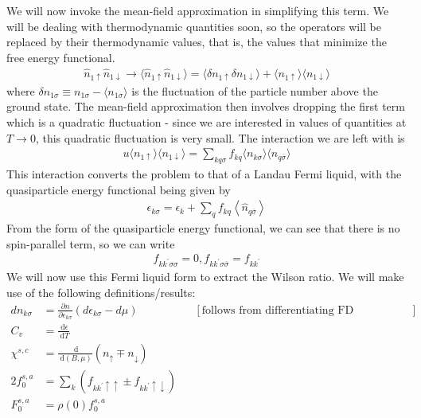 \documentclass[twoside]{report}
\numberwithin{equation}{section}
\begin{document}
We will now invoke the mean-field approximation in simplifying this term. We will be dealing with thermodynamic quantities soon, so the operators will be replaced by their thermodynamic values, that is, the values that minimize the free energy functional.
\begin{equation}\begin{aligned}
	\hat n_{1 \uparrow} \hat n_{1 \downarrow} \to \langle \hat n_{1 \uparrow} \hat n_{1 \downarrow}\rangle = \langle  \delta n_{1 \uparrow} \delta n_{1 \downarrow}\rangle + \langle  n_{1 \uparrow}\rangle\langle  n_{1 \downarrow}\rangle
\end{aligned}\end{equation}
where \(\delta n_{1\sigma} \equiv n_{1 \sigma} - \langle  n_{1\sigma} \rangle\) is the fluctuation of the particle number above the ground state. The mean-field approximation then involves dropping the first term which is a quadratic fluctuation - since we are interested in values of quantities at \( T \to 0\), this quadratic fluctuation is very small. The interaction we are left with is 
\begin{equation}\begin{aligned}
	u\langle  n_{1 \uparrow}\rangle\langle  n_{1 \downarrow}\rangle = \sum_{kq\sigma}f_{kq}\langle  n_{k \sigma}\rangle\langle  n_{q \overline\sigma}\rangle
\end{aligned}\end{equation}
This interaction converts the problem to that of a Landau Fermi liquid, with the quasiparticle energy functional being given by
\begin{equation}\begin{aligned}
	\epsilon_{k\sigma} = \epsilon_k + \sum_{q}f_{kq}\left<\hat n_{q \overline\sigma}\right>
\end{aligned}\end{equation}
From the form of the quasiparticle energy functional, we can see that there is no spin-parallel term, so we can write
\begin{equation}\begin{aligned}
	\label{rel_landau}
	f_{kk^\prime\sigma\sigma} = 0,  f_{kk^\prime\sigma\overline\sigma} = f_{kk^\prime}
\end{aligned}\end{equation}
We will now use this Fermi liquid form to extract the Wilson ratio. We will make use of the following definitions/results:
\begin{equation}\begin{aligned}
	dn_{k\sigma} &= \frac{\partial{n}}{\partial{\epsilon_{k\sigma}}}\left( d\epsilon_{k\sigma} - d\mu \right) &&\left[\text{follows from differentiating FD distribution}\right] \\
	C_v &= \frac{\:\mathrm{d}\epsilon}{\:\mathrm{d}T}\\
	\chi^{s,c} &= \frac{\:\mathrm{d}}{\:\mathrm{d}(B, \mu)}\left(n_\uparrow \mp n_\downarrow\right) \\
	2f_0^{s,a} &= \sum_k\left(f_{kk^\prime \uparrow \uparrow} \pm f_{kk^\prime \uparrow \downarrow}\right)\\
	F_0^{s,a} &= \rho(0) f_0^{s,a}
\end{aligned}\end{equation}
\end{document}
